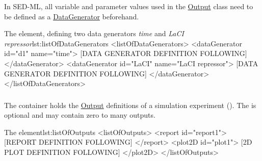 In SED-ML, all variable and parameter values used in the \hyperref[class:output]{Output} class need to be defined as a \hyperref[class:dataGenerator]{DataGenerator} beforehand.


\begin{myXmlLst}{The  element, defining two data generators \emph{time} and \emph{LaCI repressor}}{lst:listOfDataGenerators}
<listOfDataGenerators>
	<dataGenerator id="d1" name="time">
		[DATA GENERATOR DEFINITION FOLLOWING]
	</dataGenerator>
	<dataGenerator id="LaCI" name="LaCI repressor">
		[DATA GENERATOR DEFINITION FOLLOWING]
	</dataGenerator>
</listOfDataGenerators>
\end{myXmlLst}


\subsubsection{}
\label{sec:listOfOutputs}
The  container holds the \hyperref[class:output]{Output} definitions of a simulation experiment (). The  is optional and may contain zero to many outputs.

\begin{myXmlLst}{The  element}{lst:listOfOutputs}
<listOfOutputs>
	<report id="report1">
		[REPORT DEFINITION FOLLOWING]
	</report>
	<plot2D id="plot1">
		[2D PLOT DEFINITION FOLLOWING] 
	</plot2D>
</listOfOutputs>
\end{myXmlLst}
